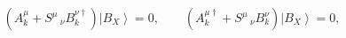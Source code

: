 \begin{equation}
\left( A_{k}^{\mu}+S^{\mu}\,\!\!_{\nu}B_{k}^{\nu\dagger }\right)
\left| B_{X}\right\rangle =0, \qquad
\left( A_{k}^{\mu\dagger } + S^{\mu}\,\!\!_{\nu}B_{k}^{\nu}\right) 
\left| B_{X}\right\rangle  = 0,
\label{ec1}
\end{equation} 
